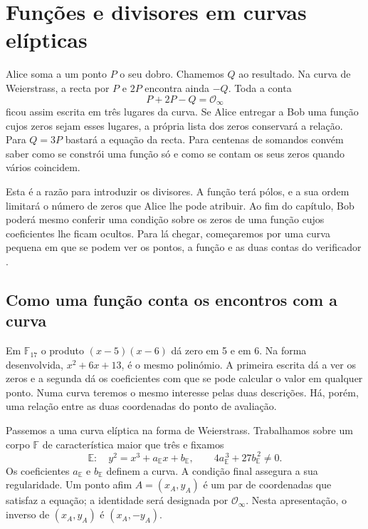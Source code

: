 \chapter{Funções e divisores em curvas elípticas}
\label{chapter:divisors}
\label{sec:fcmp-divisors}
\hypertarget{excerto.divisores.inicio}{}

Alice soma a um ponto \(P\) o seu dobro. Chamemos \(Q\) ao resultado.
Na curva de Weierstrass, a recta por \(P\) e \(2P\) encontra ainda
\(-Q\). Toda a conta
\[
                   P+2P-Q=\mathcal O_\infty
\]
ficou assim escrita em três lugares da curva. Se Alice entregar a Bob
uma função cujos zeros sejam esses lugares, a própria lista dos zeros
conservará a relação. Para \(Q=3P\) bastará a equação da recta. Para
centenas de somandos convém saber como se constrói uma função só e
como se contam os seus zeros quando vários coincidem.

Esta é a razão para introduzir os divisores. A função terá pólos, e
a sua ordem limitará o número de zeros que Alice lhe pode atribuir.
Ao fim do capítulo, Bob poderá mesmo conferir uma condição sobre os
zeros de uma função cujos coeficientes lhe ficam ocultos. Para lá
chegar, começaremos por uma curva pequena em que se podem ver os
pontos, a função e as duas contas do verificador
\cite{eagen-divisors}.

\section{Como uma função conta os encontros com a curva}
\label{sec:divisors-functions}

Em \(\mathbb F_{17}\) o produto \((x-5)(x-6)\) dá zero em 5 e
em 6. Na forma desenvolvida, \(x^2+6x+13\), é o mesmo polinómio.
A primeira escrita dá a ver os zeros e a segunda dá os coeficientes
com que se pode calcular o valor em qualquer ponto. Numa curva
teremos o mesmo interesse pelas duas descrições. Há, porém, uma
relação entre as duas coordenadas do ponto de avaliação.

Passemos a uma curva elíptica na forma de Weierstrass. Trabalhamos sobre
um corpo \(\mathbb F\) de característica maior que três e fixamos
\begin{equation}
 \mathbb E:\quad y^2=x^3+a_{\mathbb E}x+b_{\mathbb E},
 \qquad 4a_{\mathbb E}^{\,3}+27b_{\mathbb E}^{\,2}\ne0.
 \label{eq:fcmp-short-weierstrass}
\end{equation}
Os coeficientes \(a_{\mathbb E}\) e \(b_{\mathbb E}\) definem a curva.
A condição final assegura a sua regularidade. Um ponto afim
\(A=(x_A,y_A)\) é um par de coordenadas que satisfaz a equação; a
identidade será designada por \(\mathcal O_\infty\). Nesta apresentação,
o inverso de \((x_A,y_A)\) é \((x_A,-y_A)\).

